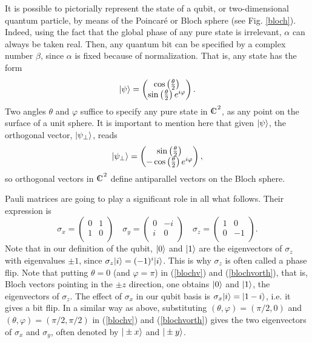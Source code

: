 \documentclass[a4paper]{article}
\def\0{\overline{0}}
\def\compl{\begin{picture}(8,8)\put(0,0){C}\put(3,0.3){\line(0,1){7}}\end{picture}}
\begin{document}
It is possible to pictorially represent the state of a qubit, or
two-dimensional quantum particle, by means of the Poincar\'e
or Bloch sphere (see Fig. \ref{bloch}). Indeed, using
the fact that the global phase of any pure state is irrelevant,
$\alpha$ can always be taken real. Then, any quantum bit can be
specified by a complex number $\beta$, since $\alpha$ is fixed
because of normalization. That is, any state has the form
\begin{equation}
\label{blochv}
    |\psi\rangle=\begin{pmatrix}\cos\left(\frac{\theta}{2}\right)
    \\\sin\left(\frac{\theta}{2}\right)e^{i\varphi}\\\end{pmatrix}
    .
\end{equation}
Two angles $\theta$ and $\varphi$ suffice to specify any pure
state in $\compl^2$, as any point on the surface of a unit sphere.
It is important to mention here that given $|\psi\rangle$, the
orthogonal vector, $|\psi_\perp\rangle$, reads
\begin{equation}
\label{blochvorth}
    |\psi_\perp\rangle=\begin{pmatrix}\sin\left(\frac{\theta}{2}\right)
    \\-\cos\left(\frac{\theta}{2}\right)e^{i\varphi}\\\end{pmatrix}
    ,
\end{equation}
so orthogonal vectors in $\compl^2$ define antiparallel vectors on
the Bloch sphere.

Pauli matrices are going to play a significant role
in all what follows. Their expression is
\begin{equation}\label{pauli}
    \sigma_x=\begin{pmatrix}0&1\\1&0\\\end{pmatrix}\quad
    \sigma_y=\begin{pmatrix}0&-i\\i&0\\\end{pmatrix}\quad
    \sigma_z=\begin{pmatrix}1&0\\0&-1\\\end{pmatrix} .
\end{equation}
Note that in our definition of the qubit, $|0\rangle$ and $|1\rangle$
are the eigenvectors of $\sigma_z$ with eigenvalues $\pm 1$, since
$\sigma_z|i\rangle=(-1)^i|i\rangle$. This is why $\sigma_z$ is often
called a phase flip. Note that putting $\theta=0$ (and
$\varphi=\pi$) in (\ref{blochv}) and (\ref{blochvorth}), that is, Bloch
vectors pointing in the $\pm z$ direction, one obtains $|0\rangle$
and $|1\rangle$, the eigenvectors of $\sigma_z$. The effect of
$\sigma_x$ in our qubit basis is $\sigma_x|i\rangle=|1-i\rangle$, i.e.
it gives a bit flip. In a similar way as above, substituting
$(\theta,\varphi)=(\pi/2,0)$ and $(\theta,\varphi)=(\pi/2,\pi/2)$
in (\ref{blochv}) and (\ref{blochvorth}) gives the two eigenvectors of
$\sigma_x$ and $\sigma_y$, often denoted by $|\pm x\rangle$ and $|\pm y\rangle$.
\end{document}
